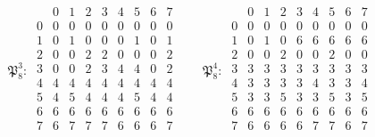 \documentclass[11pt]{amsart}
\theoremstyle{definition}
\begin{document}
\begin{gather*}
\mathfrak P_8^{3}:\ \begin{array}{c|cccccccc} & 0 & 1 & 2 & 3 & 4 & 5 & 6 & 7\\ \hline 0 & 0 & 0 & 0 & 0 & 0 & 0 & 0 & 0\\ 1 & 0 & 1 & 0 & 0 & 0 & 1 & 0 & 1\\ 2 & 0 & 0 & 2 & 2 & 0 & 0 & 0 & 2\\ 3 & 0 & 0 & 2 & 3 & 4 & 4 & 0 & 2\\ 4 & 4 & 4 & 4 & 4 & 4 & 4 & 4 & 4\\ 5 & 4 & 5 & 4 & 4 & 4 & 5 & 4 & 4\\ 6 & 6 & 6 & 6 & 6 & 6 & 6 & 6 & 6\\ 7 & 6 & 7 & 7 & 7 & 6 & 6 & 6 & 7\\\end{array}\qquad \mathfrak P_8^{4}:\ \begin{array}{c|cccccccc} & 0 & 1 & 2 & 3 & 4 & 5 & 6 & 7\\ \hline 0 & 0 & 0 & 0 & 0 & 0 & 0 & 0 & 0\\ 1 & 0 & 1 & 0 & 6 & 6 & 6 & 6 & 6\\ 2 & 0 & 0 & 2 & 0 & 0 & 2 & 0 & 0\\ 3 & 3 & 3 & 3 & 3 & 3 & 3 & 3 & 3\\ 4 & 3 & 3 & 3 & 3 & 4 & 3 & 3 & 4\\ 5 & 3 & 3 & 5 & 3 & 3 & 5 & 3 & 5\\ 6 & 6 & 6 & 6 & 6 & 6 & 6 & 6 & 6\\ 7 & 6 & 6 & 6 & 6 & 7 & 7 & 6 & 7\\\end{array}\\[1ex]

\end{gather*}
\end{document}
